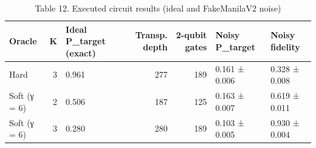 \begin{table}
\caption{Table 12. Executed circuit results (ideal and FakeManilaV2 noise)}
\label{tab:table12}
\begin{tabular}{lrlrrll}
\toprule
Oracle & K & Ideal P\_target (exact) & Transp. depth & 2-qubit gates & Noisy P\_target & Noisy fidelity \\
\midrule
Hard & 3 & 0.961 & 277 & 189 & 0.161 ± 0.006 & 0.328 ± 0.008 \\
Soft (γ = 6) & 2 & 0.506 & 187 & 125 & 0.163 ± 0.007 & 0.619 ± 0.011 \\
Soft (γ = 6) & 3 & 0.280 & 280 & 189 & 0.103 ± 0.005 & 0.930 ± 0.004 \\
\bottomrule
\end{tabular}
\end{table}

